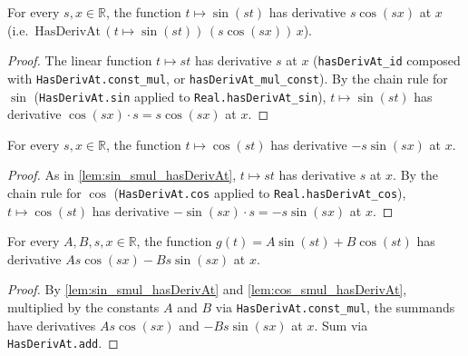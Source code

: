 \begin{lemma}
    \label{lem:sin_smul_hasDerivAt}
    \leanok
    For every $s, x \in \mathbb{R}$, the function $t \mapsto \sin(st)$ has
    derivative $s \cos(sx)$ at $x$ (i.e.\ $\mathrm{HasDerivAt}\,(t \mapsto
    \sin(st))\, (s\cos(sx))\, x$).
\end{lemma}
\begin{proof}
    The linear function $t \mapsto s t$ has derivative $s$ at $x$ (\texttt{hasDerivAt\_id}
    composed with \texttt{HasDerivAt.const\_mul}, or
    \texttt{hasDerivAt\_mul\_const}). By the chain rule for $\sin$
    (\texttt{HasDerivAt.sin} applied to \texttt{Real.hasDerivAt\_sin}),
    $t \mapsto \sin(st)$ has derivative $\cos(sx) \cdot s = s\cos(sx)$ at $x$.
\end{proof}

\begin{lemma}
    \label{lem:cos_smul_hasDerivAt}
    \leanok
    For every $s, x \in \mathbb{R}$, the function $t \mapsto \cos(st)$ has
    derivative $-s \sin(sx)$ at $x$.
\end{lemma}
\begin{proof}
    As in \cref{lem:sin_smul_hasDerivAt}, $t \mapsto s t$ has derivative $s$ at
    $x$. By the chain rule for $\cos$ (\texttt{HasDerivAt.cos} applied to
    \texttt{Real.hasDerivAt\_cos}), $t \mapsto \cos(st)$ has derivative
    $-\sin(sx) \cdot s = -s\sin(sx)$ at $x$.
\end{proof}

\begin{lemma}
    \label{lem:sin_cos_combo_first_deriv}
    For every $A, B, s, x \in \mathbb{R}$, the function
    $g(t) = A \sin(st) + B \cos(st)$ has derivative
    $A s \cos(sx) - B s \sin(sx)$ at $x$.
\end{lemma}
\begin{proof}
    By \cref{lem:sin_smul_hasDerivAt} and \cref{lem:cos_smul_hasDerivAt},
    multiplied by the constants $A$ and $B$ via \texttt{HasDerivAt.const\_mul},
    the summands have derivatives $A s \cos(sx)$ and $-B s \sin(sx)$ at $x$.
    Sum via \texttt{HasDerivAt.add}.
\end{proof}

